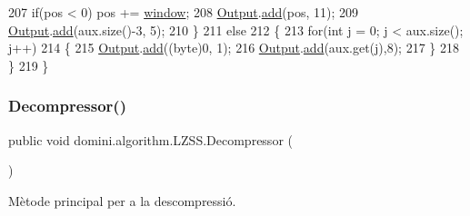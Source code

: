 \begin{DoxyCode}
207             \textcolor{keywordflow}{if}(pos < 0) pos += \hyperlink{classdomini_1_1algorithm_1_1LZSS_a00d9f2e9bc2baa39513fad040b8e7123}{window};
208             \hyperlink{classdomini_1_1algorithm_1_1Algorithm_a4de9955411c656325adc391ef570c082}{Output}.\hyperlink{classpersistencia_1_1output_1_1Ctrl__Output_a8c5aa5a6acb5259faeb1c05c71ddd21c}{add}(pos, 11);
209             \hyperlink{classdomini_1_1algorithm_1_1Algorithm_a4de9955411c656325adc391ef570c082}{Output}.\hyperlink{classpersistencia_1_1output_1_1Ctrl__Output_a8c5aa5a6acb5259faeb1c05c71ddd21c}{add}(aux.size()-3, 5);
210         \}
211         \textcolor{keywordflow}{else}
212         \{
213             \textcolor{keywordflow}{for}(\textcolor{keywordtype}{int} j = 0; j < aux.size(); j++)
214             \{
215                 \hyperlink{classdomini_1_1algorithm_1_1Algorithm_a4de9955411c656325adc391ef570c082}{Output}.\hyperlink{classpersistencia_1_1output_1_1Ctrl__Output_a8c5aa5a6acb5259faeb1c05c71ddd21c}{add}((byte)0, 1);
216                 \hyperlink{classdomini_1_1algorithm_1_1Algorithm_a4de9955411c656325adc391ef570c082}{Output}.\hyperlink{classpersistencia_1_1output_1_1Ctrl__Output_a8c5aa5a6acb5259faeb1c05c71ddd21c}{add}(aux.get(j),8);
217             \}
218         \}
219     \}
\end{DoxyCode}
\mbox{\label{classdomini_1_1algorithm_1_1LZSS_a665ab942951b839e63dc06e707bba1ad}} 
\subsubsection{\texorpdfstring{Decompressor()}{Decompressor()}}
{\footnotesize\ttfamily public void domini.\+algorithm.\+L\+Z\+S\+S.\+Decompressor (\begin{DoxyParamCaption}{ }\end{DoxyParamCaption})\hspace{0.3cm}{\ttfamily [inline]}}



Mètode principal per a la descompressió. 


